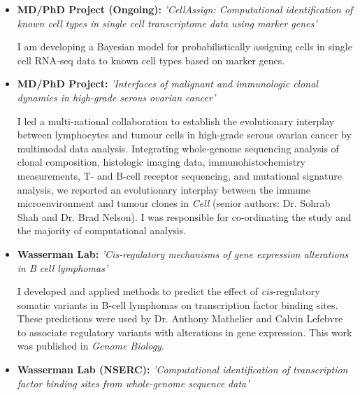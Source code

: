 \documentclass[11pt,a4paper,sans]{moderncv}        %
\begin{document}
\begin{itemize}

\item{\textbf{MD/PhD Project (Ongoing):} \textit{'CellAssign: Computational identification of known cell types in single cell transcriptome data using marker genes'}

\vspace{3pt}

\small{I am developing a Bayesian model for probabilistically assigning cells in single cell RNA-seq data to known cell types based on marker genes.}}

\vspace{6pt}

\item{\textbf{MD/PhD Project:} \textit{'Interfaces of malignant and immunologic clonal dynamics in high-grade serous ovarian cancer'}

\vspace{3pt}

\small{I led a multi-national collaboration to establish the evolutionary interplay between lymphocytes and tumour cells in high-grade serous ovarian cancer by multimodal data analysis. Integrating whole-genome sequencing analysis of clonal composition, histologic imaging data, immunohistochemistry measurements, T- and B-cell receptor sequencing, and mutational signature analysis, we reported an evolutionary interplay between the immune microenvironment and tumour clones in \emph{Cell} (senior authors: Dr. Sohrab Shah and Dr. Brad Nelson). I was responsible for co-ordinating the study and the majority of computational analysis.}}

\vspace{6pt}

\item{\textbf{Wasserman Lab:} \textit{'Cis-regulatory mechanisms of gene expression alterations in B cell lymphomas'}

\vspace{3pt}

\small{I developed and applied methods to predict the effect of \emph{cis}-regulatory somatic variants in B-cell lymphomas on transcription factor binding sites. These predictions were used by Dr. Anthony Mathelier and Calvin Lefebvre to associate regulatory variants with alterations in gene expression. This work was published in \emph{Genome Biology}.}}

\vspace{6pt}

\item{\textbf{Wasserman Lab (NSERC):} \textit{'Computational identification of transcription factor binding sites from whole-genome sequence data'}

}
\end{itemize}
\end{document}
